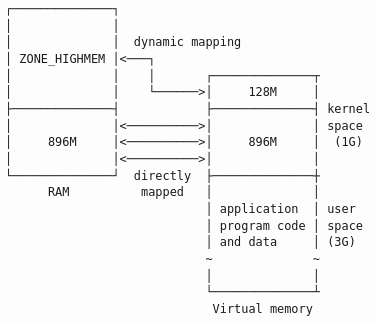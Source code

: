 \documentclass[varwidth]{standalone}
\begin{document}
\begin{verbatim}
┌──────────────┐
│              │
│              │  dynamic mapping
│ ZONE_HIGHMEM │<───┐
│              │    │       ┌──────────────┬
│              │    └──────>│     128M     │
├──────────────┤            ├──────────────┤ kernel
│              │<──────────>│              │ space
│     896M     │<──────────>│     896M     │  (1G)
│              │<──────────>│              │
└──────────────┘  directly  ├──────────────┼
      RAM          mapped   │              │
                            │ application  │ user
                            │ program code │ space
                            │ and data     │ (3G)
                            ~              ~
                            │              │
                            └──────────────┴
                             Virtual memory
\end{verbatim}
\end{document}
